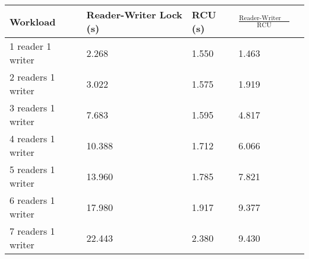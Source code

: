 \begin{tabular}{|l|l|l|l|l|}
\hline Workload &Reader-Writer Lock (s) & RCU (s) & $\frac{\mbox{Reader-Writer Lock}}{\mbox{RCU}} $ \\
\hline 1 reader 1 writer & 2.268 & 1.550&1.463\\
\hline 2 readers 1 writer & 3.022 & 1.575&1.919\\
\hline 3 readers 1 writer & 7.683 & 1.595&4.817\\
\hline 4 readers 1 writer & 10.388 & 1.712&6.066\\
\hline 5 readers 1 writer & 13.960 & 1.785&7.821\\
\hline 6 readers 1 writer & 17.980 & 1.917&9.377\\
\hline 7 readers 1 writer & 22.443 & 2.380&9.430\\
\hline
\end{tabular}
